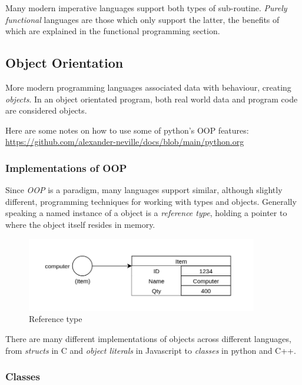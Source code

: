 \documentclass[10pt]{article}
\begin{document}
Many modern imperative languages support both types of sub-routine. \emph{Purely functional} languages are those which only support the latter, the benefits of which are explained in the functional programming section.

\subsection{Object Orientation}
\label{sec:org5a64cd8}

More modern programming languages associated data with behaviour, creating \emph{objects}. In an object orientated program, both real world data and program code are considered objects.

Here are some notes on how to use some of python's OOP features: \url{https://github.com/alexander-neville/docs/blob/main/python.org}

\subsubsection{Implementations of OOP}
\label{sec:orgb00e550}

Since \emph{OOP} is a paradigm, many languages support similar, although slightly different, programming techniques for working with types and objects. Generally speaking a named instance of a object is a \emph{reference type}, holding a pointer to where the object itself resides in memory.

\begin{figure}[H]
\centering
\includegraphics[width=0.9\textwidth,keepaspectratio, frame]{./images/reference.png}
\caption{Reference type}
\end{figure}

There are many different implementations of objects across different languages, from \emph{structs} in C and \emph{object literals} in Javascript to \emph{classes} in python and C++.

\subsubsection{Classes}
\label{sec:orgbe3726e}
\end{document}
